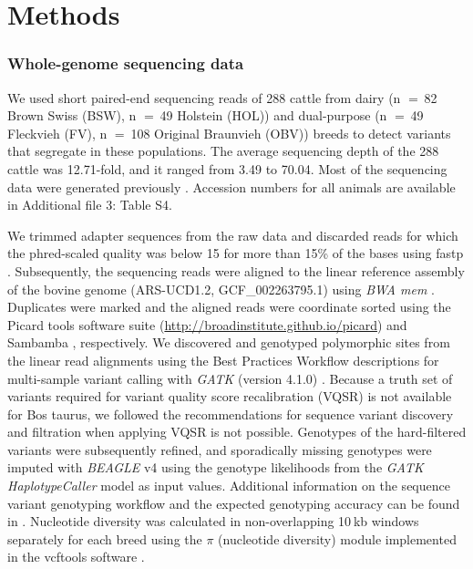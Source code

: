 \documentclass[../main.tex]{subfiles}
\begin{document}
\section{Methods}

\subsubsection*{Whole-genome sequencing data}

We used short paired-end sequencing reads of 288 cattle from dairy (n $=$ 82 Brown Swiss (BSW), n $=$ 49 Holstein (HOL)) and dual-purpose (n $=$ 49 Fleckvieh (FV), n $=$ 108 Original Braunvieh (OBV)) breeds to detect variants that segregate in these populations. The average sequencing depth of the 288 cattle was 12.71-fold, and it ranged from 3.49 to 70.04. Most of the sequencing data were generated previously \citep{daetwyler2014whole,crysnanto2019accurate,jansen2013assessment,baes2014evaluation,hofstetter2019non}. Accession numbers for all animals are available in Additional file 3: Table S4.

We trimmed adapter sequences from the raw data and discarded reads for which the phred-scaled quality was below 15 for more than 15\% of the bases using fastp \citep{chen2018fastp}. Subsequently, the sequencing reads were aligned to the linear reference assembly of the bovine genome (ARS-UCD1.2, GCF\_002263795.1) using \emph{BWA mem} \citep{li2013aligning}. 
Duplicates were marked and the aligned reads were coordinate sorted using the Picard tools software suite (\url{http://broadinstitute.github.io/picard}) and Sambamba \citep{tarasov2015sambamba}, respectively. We discovered and genotyped polymorphic sites from the linear read alignments using the Best Practices Workflow descriptions for multi-sample variant calling with \emph{GATK} (version 4.1.0) \citep{depristo2011framework}. Because a truth set of variants required for variant quality score recalibration (VQSR) is not available for Bos taurus, we followed the recommendations for sequence variant discovery and filtration when applying VQSR is not possible. Genotypes of the hard-filtered variants were subsequently refined, and sporadically missing genotypes were imputed with \emph{BEAGLE} v4 \citep{browning2016genotype} using the genotype likelihoods from the \emph{GATK HaplotypeCaller} model as input values. Additional information on the sequence variant genotyping workflow and the expected genotyping accuracy can be found in \citep{crysnanto2019accurate}. Nucleotide diversity was calculated in non-overlapping 10 kb windows separately for each breed using the $\pi$ (nucleotide diversity) module implemented in the vcftools software \citep{danecek2011variant}.
\end{document}
